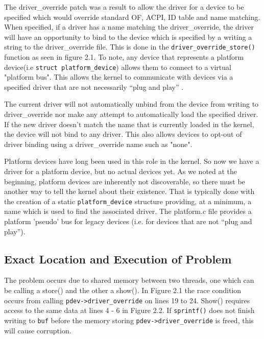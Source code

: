 \documentclass[12pt]{article}
\begin{document}
The driver\_override patch was a result to allow the driver for a device to be specified which would override standard OF, ACPI, ID table and name matching. When specified, if a driver has a name matching the driver\_override, the driver will have an opportunity to bind to the device which is specified by a writing a string to the driver\_override file. This is done in the \texttt{driver\_override\_store()} function as seen in figure 2.1. To note, any device that represents a platform device(i.e \texttt{struct platform\_device}) allows them to connect to a virtual "platform bus". This allows the kernel to communicate with devices via a specified driver that are not necessarily ``plug and play'' \cite{source-code}.


The current driver will not automatically unbind from the device from writing to driver\_override nor make any attempt to automatically load the specified driver.  If the new driver doesn't match the name that is currently loaded in the kernel, the device will not bind to any driver.  This also allows devices to opt-out of driver binding using a driver\_override name such as "none".

Platform devices have long been used in this role in the kernel. 
So now we have a driver for a platform device, but no actual devices yet. As we noted at the beginning, platform devices are inherently not discoverable, so there must be another way to tell the kernel about their existence. That is typically done with the creation of a static \texttt{platform\_device} structure providing, at a minimum, a name which is used to find the associated driver. The platform.c file provides a platform 'pseudo' bus for legacy devices\cite{source-code} (i.e. for devices that are not ``plug and play'').
%


\subsection{Exact Location and Execution of Problem}
The problem occurs due to shared memory between two threads, one which can be calling a store() and the other a show(). In Figure 2.1 the race condition occurs from calling \texttt{pdev->driver\_override} on lines 19 to 24. Show() requires access to the same data at lines 4 - 6 in Figure 2.2. If \texttt{sprintf()} does not finish writing to \texttt{buf} before the memory storing \texttt{pdev->driver\_override} is freed, this will cause corruption.
\end{document}

